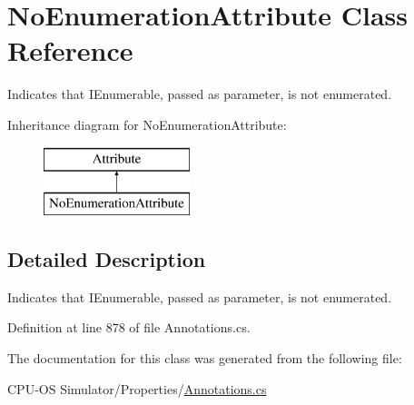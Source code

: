 \hypertarget{class_no_enumeration_attribute}{}\section{No\+Enumeration\+Attribute Class Reference}
\label{class_no_enumeration_attribute}


Indicates that I\+Enumerable, passed as parameter, is not enumerated.  


Inheritance diagram for No\+Enumeration\+Attribute\+:\begin{figure}[H]
\begin{center}
\leavevmode
\includegraphics[height=2.000000cm]{class_no_enumeration_attribute}
\end{center}
\end{figure}


\subsection{Detailed Description}
Indicates that I\+Enumerable, passed as parameter, is not enumerated. 



Definition at line 878 of file Annotations.\+cs.



The documentation for this class was generated from the following file\+:\begin{DoxyCompactItemize}
\item 
C\+P\+U-\/\+O\+S Simulator/\+Properties/\hyperlink{_annotations_8cs}{Annotations.\+cs}\end{DoxyCompactItemize}
